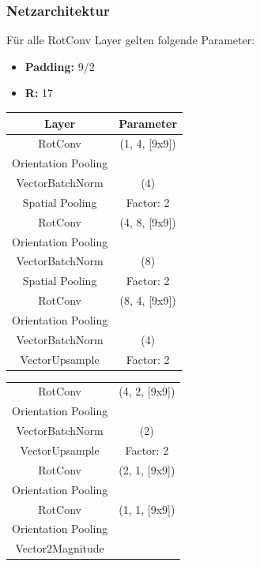 \begin{frame}
	\frametitle{Netzarchitektur}
	\footnotesize
	Für alle RotConv Layer gelten folgende Parameter:
	\begin{itemize}
		\item[] \textbf{Padding:} 9/2
		\item[] \textbf{R:} 17
	\end{itemize}
	\begin{minipage}[t]{0.5\linewidth}
		\begin{center}
			\footnotesize
		\begin{tabular}{|c|c|}
			\hline
			Layer & Parameter \\
			\hline \hline
			RotConv & (1, 4, [9x9])  \\
			Orientation Pooling &\\
			VectorBatchNorm & (4)\\
			Spatial Pooling & Factor: 2\\
			\hline	 
			RotConv & (4, 8, [9x9])  \\
			Orientation Pooling &\\
			VectorBatchNorm & (8)\\
			Spatial Pooling & Factor: 2\\
			\hline	
			RotConv & (8, 4, [9x9])  \\
			Orientation Pooling &\\
			VectorBatchNorm & (4)\\
			VectorUpsample & Factor: 2\\
			\hline	
			\end{tabular}
		\end{center}
	\end{minipage}%
	\begin{minipage}[t]{0.5\linewidth}
		\begin{center}
			\footnotesize
		\begin{tabular}{|c|c|}
			\hline
			RotConv & (4, 2, [9x9])  \\
			Orientation Pooling &\\
			VectorBatchNorm & (2)\\
			VectorUpsample & Factor: 2\\
			\hline
			RotConv & (2, 1, [9x9])  \\
			Orientation Pooling &\\
			\hline
			RotConv & (1, 1, [9x9])  \\
			Orientation Pooling &\\
			\hline
			Vector2Magnitude & \\
			\hline
		\end{tabular}
		\end{center}
\end{minipage}	
\end{frame}

